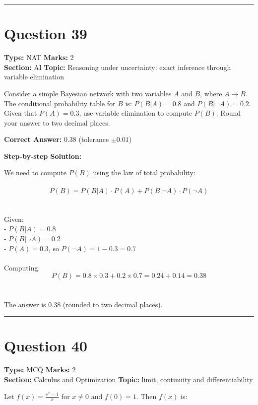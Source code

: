 \documentclass[11pt]{article}
\begin{document}
\vspace{0.8em}
\hrule
\vspace{0.4em}
\section*{Question 39}
\textbf{Type:} NAT \hfill \textbf{Marks:} 2\\
\textbf{Section:} AI \hfill \textbf{Topic:} Reasoning under uncertainty: exact inference through variable elimination

Consider a simple Bayesian network with two variables \(A\) and \(B\), where \(A \to B\). The conditional probability table for \(B\) is: \(P(B|A) = 0.8\) and \(P(B|\neg A) = 0.2\). Given that \(P(A) = 0.3\), use variable elimination to compute \(P(B)\). Round your answer to two decimal places.



\textbf{Correct Answer:} 0.38 (tolerance \(\pm 0.01\))

\textbf{Step-by-step Solution:}

We need to compute \(P(B)\) using the law of total probability:\\
\\
\[P(B) = P(B|A) \cdot P(A) + P(B|\neg A) \cdot P(\neg A)\]\\
\\
Given:\\
- \(P(B|A) = 0.8\)\\
- \(P(B|\neg A) = 0.2\)\\
- \(P(A) = 0.3\), so \(P(\neg A) = 1 - 0.3 = 0.7\)\\
\\
Computing:\\
\[P(B) = 0.8 \times 0.3 + 0.2 \times 0.7 = 0.24 + 0.14 = 0.38\]\\
\\
The answer is \(0.38\) (rounded to two decimal places).

\vspace{0.8em}
\hrule
\vspace{0.4em}
\section*{Question 40}
\textbf{Type:} MCQ \hfill \textbf{Marks:} 2\\
\textbf{Section:} Calculus and Optimization \hfill \textbf{Topic:} limit, continuity and differentiability

Let \(f(x) = \frac{e^x - 1}{x}\) for \(x \neq 0\) and \(f(0) = 1\). Then \(f(x)\) is:
\end{document}
